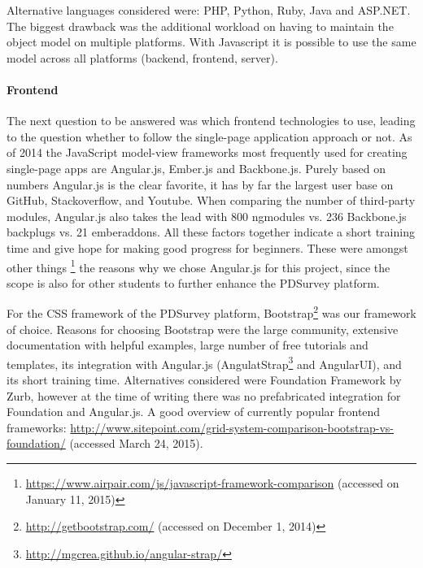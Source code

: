 		Alternative languages considered were: PHP, Python, Ruby, Java and ASP.NET. The biggest drawback was the additional workload on having to maintain the object model on multiple platforms. With Javascript it is possible to use the same model across all platforms (backend, frontend, server).


	\paragraph{Frontend}

		The next question to be answered was which frontend technologies to use, leading to the question whether to follow the single-page application approach or not. As of 2014 the JavaScript model-view frameworks most frequently used for creating single-page apps are Angular.js, Ember.js and Backbone.js. Purely based on numbers Angular.js is the clear favorite, it has by far the largest user base on GitHub, Stackoverflow, and Youtube. When comparing the number of third-party modules, Angular.js also takes the lead with 800 ngmodules vs. 236 Backbone.js backplugs vs. 21 emberaddons. All these factors together indicate a short training time and give hope for making good progress for beginners. These were amongst other things	\footnote{\url{https://www.airpair.com/js/javascript-framework-comparison} (accessed on January 11, 2015)} the reasons why we chose Angular.js for this project, since the scope is also for other students to further enhance the PDSurvey platform.

		For the CSS framework of the PDSurvey platform, Bootstrap\footnote{\url{http://getbootstrap.com/} (accessed on December 1, 2014)} was our framework of choice. Reasons for choosing Bootstrap were the large community, extensive documentation with helpful examples, large number of free tutorials and templates, its integration with Angular.js (AngulatStrap\footnote{\url{http://mgcrea.github.io/angular-strap/}} and AngularUI), and its short training time.
		Alternatives considered were Foundation Framework by Zurb, however at the time of writing there was no prefabricated integration for Foundation and Angular.js.
		A good overview of currently popular frontend frameworks: \url{http://www.sitepoint.com/grid-system-comparison-bootstrap-vs-foundation/} (accessed March 24, 2015).


	


